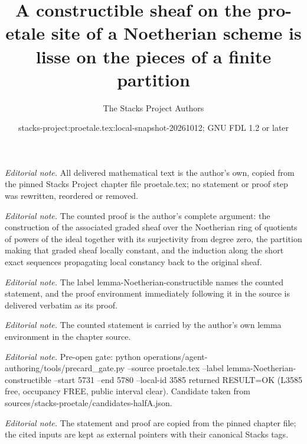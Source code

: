 \documentclass[10pt,a4paper]{amsart}
\title{A constructible sheaf on the pro-etale site of a Noetherian scheme is lisse on the pieces of a finite partition}
\author{The Stacks Project Authors}
\date{stacks-project:proetale.tex:local-snapshot-20261012; GNU FDL 1.2 or later}
\theoremstyle{plain}
\theoremstyle{definition}
\theoremstyle{remark}
\numberwithin{equation}{subsection}
\begin{document}
\maketitle
\noindent\textit{Editorial note.} All delivered mathematical text is the author's own, copied from the pinned Stacks Project chapter file proetale.tex; no statement or proof step was rewritten, reordered or removed.\par\medskip
\noindent\textit{Editorial note.} The counted proof is the author's complete argument: the construction of the associated graded sheaf over the Noetherian ring of quotients of powers of the ideal together with its surjectivity from degree zero, the partition making that graded sheaf locally constant, and the induction along the short exact sequences propagating local constancy back to the original sheaf.\par\medskip
\noindent\textit{Editorial note.} The label lemma-Noetherian-constructible names the counted statement, and the proof environment immediately following it in the source is delivered verbatim as its proof.\par\medskip
\noindent\textit{Editorial note.} The counted statement is carried by the author's own lemma environment in the chapter source.\par\medskip
\noindent\textit{Editorial note.} Pre-open gate: python operations/agent-authoring/tools/precard\_gate.py --source proetale.tex --label lemma-Noetherian-constructible --start 5731 --end 5780 --local-id 3585 returned RESULT=OK (L3585 free, occupancy FREE, public interval clear). Candidate taken from sources/stacks-proetale/candidates-halfA.json.\par\medskip
\noindent\textit{Editorial note.} The statement and proof are copied from the pinned chapter file; the cited inputs are kept as external pointers with their canonical Stacks tags.\par\medskip
\end{document}
